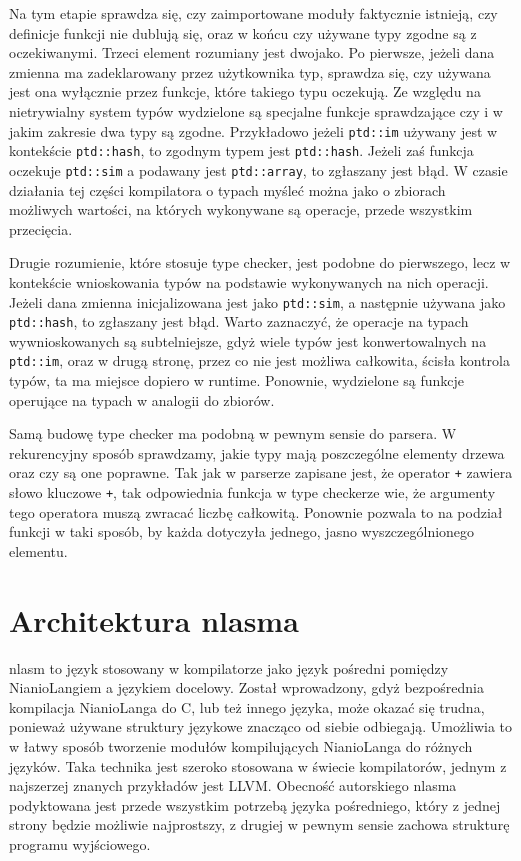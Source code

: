 \documentclass[licencjacka]{pracamgr}
\begin{document}
Na tym etapie sprawdza się, czy zaimportowane moduły faktycznie istnieją, czy definicje funkcji nie dublują się, oraz w końcu czy używane typy zgodne
są z oczekiwanymi. Trzeci element rozumiany jest dwojako. Po pierwsze, jeżeli dana zmienna ma zadeklarowany przez użytkownika typ, sprawdza się, czy
używana jest ona wyłącznie przez funkcje, które takiego typu oczekują.  Ze względu na nietrywialny system typów wydzielone są specjalne funkcje
sprawdzające czy i w jakim zakresie dwa typy są zgodne. Przykładowo jeżeli \texttt{ptd::im} używany jest w kontekście \texttt{ptd::hash}, to zgodnym typem jest
\texttt{ptd::hash}. Jeżeli zaś funkcja oczekuje \texttt{ptd::sim} a podawany jest \texttt{ptd::array}, to zgłaszany jest błąd. W czasie działania tej części kompilatora o typach myśleć można
jako o zbiorach możliwych wartości, na których wykonywane są operacje, przede wszystkim przecięcia.

Drugie rozumienie, które stosuje type checker, jest podobne do pierwszego, lecz w kontekście wnioskowania typów na podstawie wykonywanych na nich
operacji. Jeżeli dana zmienna inicjalizowana jest jako \texttt{ptd::sim}, a następnie używana jako \texttt{ptd::hash}, to zgłaszany jest błąd. Warto zaznaczyć,
że operacje na typach wywnioskowanych są subtelniejsze, gdyż wiele typów jest konwertowalnych na \texttt{ptd::im}, oraz w drugą stronę, przez co nie jest
możliwa całkowita, ścisła kontrola typów, ta ma miejsce dopiero w runtime. Ponownie, wydzielone są funkcje operujące na typach w analogii do zbiorów.

Samą budowę type checker ma podobną w pewnym sensie do parsera. W rekurencyjny sposób sprawdzamy, jakie typy mają poszczególne elementy drzewa oraz
czy są one poprawne. Tak jak w parserze zapisane jest, że operator \texttt{+} zawiera słowo kluczowe \texttt{+}, tak odpowiednia funkcja w type
checkerze wie, że argumenty tego operatora muszą zwracać liczbę całkowitą. Ponownie pozwala to na podział funkcji w taki sposób, by każda
dotyczyła jednego, jasno wyszczególnionego elementu.
\section{Architektura nlasma}
nlasm to język stosowany w kompilatorze jako język pośredni pomiędzy NianioLangiem a językiem docelowy.
Został wprowadzony, gdyż bezpośrednia kompilacja NianioLanga do C, lub
też innego języka, może okazać się trudna, ponieważ używane struktury językowe znacząco od siebie odbiegają. Umożliwia to w łatwy sposób tworzenie
modułów kompilujących NianioLanga do różnych języków. Taka technika jest szeroko stosowana w świecie kompilatorów, jednym z najszerzej znanych
przykładów jest LLVM. Obecność autorskiego nlasma podyktowana jest przede wszystkim potrzebą języka pośredniego, który z jednej strony będzie możliwie
najprostszy, z drugiej w pewnym sensie zachowa strukturę programu wyjściowego.
\end{document}
